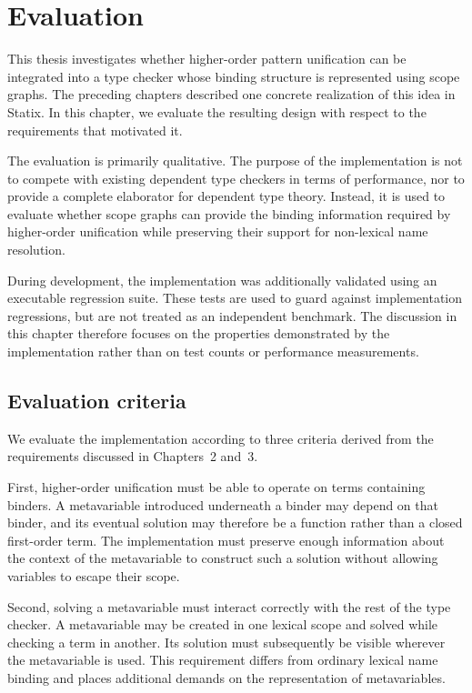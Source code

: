 \chapter{Evaluation}
\label{chap:evaluation}

This thesis investigates whether higher-order pattern unification can be
integrated into a type checker whose binding structure is represented using
scope graphs. The preceding chapters described one concrete realization of
this idea in Statix. In this chapter, we evaluate the resulting design with
respect to the requirements that motivated it.

The evaluation is primarily qualitative. The purpose of the implementation is
not to compete with existing dependent type checkers in terms of performance,
nor to provide a complete elaborator for dependent type theory. Instead, it is
used to evaluate whether scope graphs can provide the binding information
required by higher-order unification while preserving their support for
non-lexical name resolution.

During development, the implementation was additionally validated using an
executable regression suite. These tests are used to guard against
implementation regressions, but are not treated as an independent benchmark.
The discussion in this chapter therefore focuses on the properties
demonstrated by the implementation rather than on test counts or performance
measurements.

\section{Evaluation criteria}
\label{sec:evaluation-criteria}

We evaluate the implementation according to three criteria derived from the
requirements discussed in Chapters~2 and~3.

First, higher-order unification must be able to operate on terms containing
binders. A metavariable introduced underneath a binder may depend on that
binder, and its eventual solution may therefore be a function rather than a
closed first-order term. The implementation must preserve enough information
about the context of the metavariable to construct such a solution without
allowing variables to escape their scope.

Second, solving a metavariable must interact correctly with the rest of the
type checker. A metavariable may be created in one lexical scope and solved
while checking a term in another. Its solution must subsequently be visible
wherever the metavariable is used. This requirement differs from ordinary
lexical name binding and places additional demands on the representation of
metavariables.

